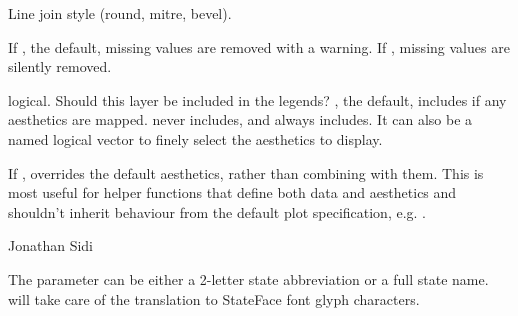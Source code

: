 \documentclass[a4paper]{book}
\begin{document}
\begin{Arguments}
\begin{ldescription}
\item[\code{linejoin}] Line join style (round, mitre, bevel).

\item[\code{na.rm}] If , the default, missing values are removed with
a warning. If , missing values are silently removed.

\item[\code{show.legend}] logical. Should this layer be included in the legends?
, the default, includes if any aesthetics are mapped.
 never includes, and  always includes.
It can also be a named logical vector to finely select the aesthetics to
display.

\item[\code{inherit.aes}] If , overrides the default aesthetics,
rather than combining with them. This is most useful for helper functions
that define both data and aesthetics and shouldn't inherit behaviour from
the default plot specification, e.g. .
\end{ldescription}
\end{Arguments}
%
\begin{Author}
Jonathan Sidi
\end{Author}
%
\begin{Examples}
\end{Examples}
%
\begin{Description}
The  parameter can be either a 2-letter state abbreviation
or a full state name.  will take care of the
translation to StateFace font glyph characters.
\end{Description}
\end{document}

